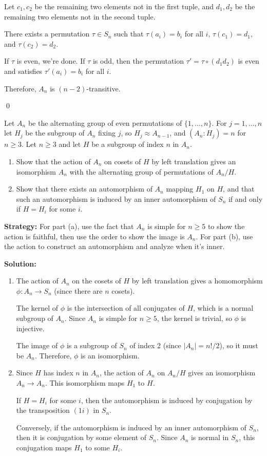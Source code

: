 Let $c_1, c_2$ be the remaining two elements not in the first tuple, and $d_1, d_2$ be the remaining two elements not in the second tuple.

There exists a permutation $\tau \in S_n$ such that $\tau(a_i) = b_i$ for all $i$, $\tau(c_1) = d_1$, and $\tau(c_2) = d_2$.

If $\tau$ is even, we're done. If $\tau$ is odd, then the permutation $\tau' = \tau \circ (d_1 d_2)$ is even and satisfies $\tau'(a_i) = b_i$ for all $i$.

Therefore, $A_n$ is $(n-2)$-transitive.


\qed
\begin{problembox}
Let $A_n$ be the alternating group of even permutations of $\{1, \ldots, n\}$. For $j = 1, \ldots, n$ let $H_j$ be the subgroup of $A_n$ fixing $j$, so $H_j \approx A_{n-1}$, and $(A_n : H_j) = n$ for $n \geq 3$. Let $n \geq 3$ and let $H$ be a subgroup of index $n$ in $A_n$.
\begin{enumerate}[label=(\alph*)]
\item Show that the action of $A_n$ on cosets of $H$ by left translation gives an isomorphism $A_n$ with the alternating group of permutations of $A_n/H$.
\item Show that there exists an automorphism of $A_n$ mapping $H_1$ on $H$, and that such an automorphism is induced by an inner automorphism of $S_n$ if and only if $H = H_i$ for some $i$.
\end{enumerate}
\end{problembox}

\noindent\textbf{Strategy:} For part (a), use the fact that $A_n$ is simple for $n \geq 5$ to show the action is faithful, then use the order to show the image is $A_n$. For part (b), use the action to construct an automorphism and analyze when it's inner.

\noindent\textbf{Solution:}
\begin{enumerate}[label=(\alph*)]
\item The action of $A_n$ on the cosets of $H$ by left translation gives a homomorphism $\phi: A_n \to S_n$ (since there are $n$ cosets).

The kernel of $\phi$ is the intersection of all conjugates of $H$, which is a normal subgroup of $A_n$. Since $A_n$ is simple for $n \geq 5$, the kernel is trivial, so $\phi$ is injective.

The image of $\phi$ is a subgroup of $S_n$ of index 2 (since $|A_n| = n!/2$), so it must be $A_n$. Therefore, $\phi$ is an isomorphism.

\item Since $H$ has index $n$ in $A_n$, the action of $A_n$ on $A_n/H$ gives an isomorphism $A_n \to A_n$. This isomorphism maps $H_1$ to $H$.

If $H = H_i$ for some $i$, then the automorphism is induced by conjugation by the transposition $(1i)$ in $S_n$.

Conversely, if the automorphism is induced by an inner automorphism of $S_n$, then it is conjugation by some element of $S_n$. Since $A_n$ is normal in $S_n$, this conjugation maps $H_1$ to some $H_i$.
\end{enumerate}


